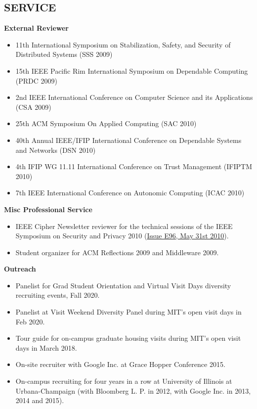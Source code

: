 \documentclass[line,margin]{res}
\begin{document}
\begin{resume}
\section{SERVICE}
  \textbf{External Reviewer}
  \begin{itemize}  \itemsep -2pt
  \item 11th International Symposium on Stabilization, Safety, and Security of Distributed Systems (SSS 2009)
  \item 15th IEEE Pacific Rim International Symposium on Dependable Computing (PRDC 2009)
  \item 2nd IEEE International Conference on Computer Science and its Applications (CSA 2009)
  \item 25th ACM Symposium On Applied Computing (SAC 2010)
  \item 40th Annual IEEE/IFIP International Conference on Dependable Systems and Networks (DSN 2010)
  \item 4th IFIP WG 11.11 International Conference on Trust Management (IFIPTM 2010)
  \item 7th IEEE International Conference on Autonomic Computing (ICAC 2010)
  \end{itemize}
  \textbf{Misc Professional Service}
  \begin{itemize}  \itemsep -2pt
  \item IEEE Cipher Newsletter reviewer for the technical sessions of the IEEE Symposium on Security and Privacy 2010 (\href{http://www.ieee-security.org/Cipher/PastIssues/2010/E96.May-2010/E96.May-2010.html}{Issue E96, May 31st 2010}).
  \item Student organizer for ACM Reflections 2009 and Middleware 2009.
  \end{itemize}
  \textbf{Outreach}
  \begin{itemize}  \itemsep -2pt
  \item Panelist for Grad Student Orientation and Virtual Visit Days diversity recruiting events, Fall 2020.
  \item Panelist at Visit Weekend Diversity Panel during MIT's open visit days in Feb 2020.
  \item Tour guide for on-campus graduate housing visits during MIT's open visit days in March 2018.
  \item On-site recruiter with Google Inc. at Grace Hopper Conference 2015.
  \item On-campus recruiting for four years in a row at University of Illinois at Urbana-Champaign (with Bloomberg L. P. in 2012, with Google Inc. in 2013, 2014 and 2015).

\end{itemize}
\end{resume}
\end{document}
